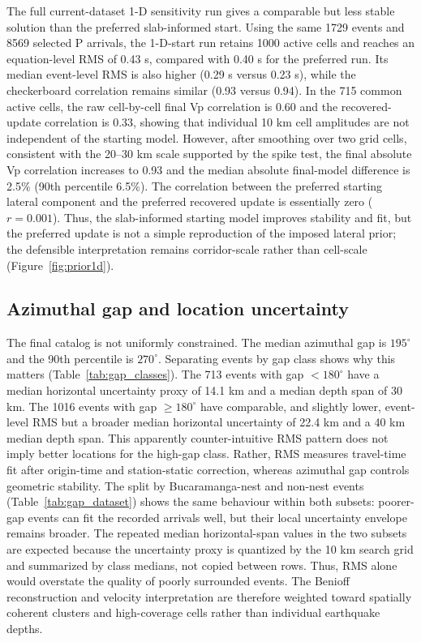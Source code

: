 \documentclass[review,authoryear]{elsarticle}
\begin{document}
The full current-dataset 1-D sensitivity run gives a comparable but less stable solution than the preferred slab-informed start. Using the same 1729 events and 8569 selected P arrivals, the 1-D-start run retains 1000 active cells and reaches an equation-level RMS of 0.43 s, compared with 0.40 s for the preferred run. Its median event-level RMS is also higher (0.29 s versus 0.23 s), while the checkerboard correlation remains similar (0.93 versus 0.94). In the 715 common active cells, the raw cell-by-cell final Vp correlation is 0.60 and the recovered-update correlation is 0.33, showing that individual 10 km cell amplitudes are not independent of the starting model. However, after smoothing over two grid cells, consistent with the 20--30 km scale supported by the spike test, the final absolute Vp correlation increases to 0.93 and the median absolute final-model difference is 2.5\% (90th percentile 6.5\%). The correlation between the preferred starting lateral component and the preferred recovered update is essentially zero ($r=0.001$). Thus, the slab-informed starting model improves stability and fit, but the preferred update is not a simple reproduction of the imposed lateral prior; the defensible interpretation remains corridor-scale rather than cell-scale (Figure~\ref{fig:prior1d}).

\subsection{Azimuthal gap and location uncertainty}
The final catalog is not uniformly constrained. The median azimuthal gap is $195^\circ$ and the 90th percentile is $270^\circ$. Separating events by gap class shows why this matters (Table~\ref{tab:gap_classes}). The 713 events with gap $<180^\circ$ have a median horizontal uncertainty proxy of 14.1 km and a median depth span of 30 km. The 1016 events with gap $\geq180^\circ$ have comparable, and slightly lower, event-level RMS but a broader median horizontal uncertainty of 22.4 km and a 40 km median depth span. This apparently counter-intuitive RMS pattern does not imply better locations for the high-gap class. Rather, RMS measures travel-time fit after origin-time and station-static correction, whereas azimuthal gap controls geometric stability. The split by Bucaramanga-nest and non-nest events (Table~\ref{tab:gap_dataset}) shows the same behaviour within both subsets: poorer-gap events can fit the recorded arrivals well, but their local uncertainty envelope remains broader. The repeated median horizontal-span values in the two subsets are expected because the uncertainty proxy is quantized by the 10 km search grid and summarized by class medians, not copied between rows. Thus, RMS alone would overstate the quality of poorly surrounded events. The Benioff reconstruction and velocity interpretation are therefore weighted toward spatially coherent clusters and high-coverage cells rather than individual earthquake depths.
\end{document}
